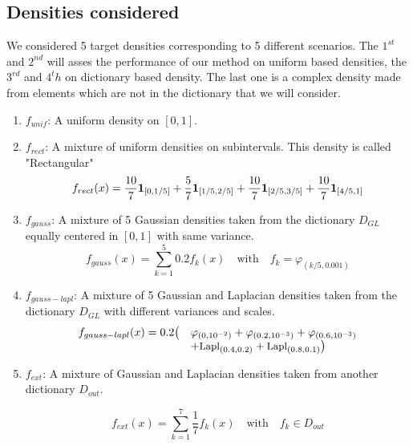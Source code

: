 \subsection{Densities considered}
We considered 5 target densities corresponding to 5 different scenarios. The $1^{st}$ and $2^{nd}$ will asses the performance of our method on uniform based densities, the $3^{rd}$ and $4^th$ on dictionary based density. The last one is a complex density made from elements which are not in the dictionary that we will consider.
\begin{enumerate}
\item{$f_{unif}$:} A uniform density on $[0,1]$.
\item{$f_{rect}$:} A mixture of uniform densities on subintervals. This density is called "Rectangular"
\begin{equation}
    f_{rect}(x)=\frac{10}{7}\b1_{[0,1/5]}+\frac{5}{7}\b1_{[1/5,2/5]}+
    \frac{10}{7}\b1_{[2/5,3/5]}+\frac{10}{7}\b1_{[4/5,1]}
\end{equation}
\item{$f_{gauss}$:} A mixture of 5 Gaussian densities taken from the dictionary $D_{GL}$ equally centered in $[0,1]$ with same variance.
\begin{equation}
    f_{gauss}(x)=\sum_{k=1}^5 0.2f_{k}(x) \quad \text{with}\quad f_k=\varphi_{(k/5,0.001)}
\end{equation}

\item{$f_{gauss-lapl}$:} A mixture of 5 Gaussian and Laplacian densities taken from the dictionary $D_{GL}$ with different variances and scales.
\begin{equation}
\begin{array}{ll}
f_{gauss-lapl}(x)=0.2\big(&\varphi_{(0 ,10^{-2})} + \varphi_{(0.2,10^{-3})}+\varphi_{(0.6,10^{-3})}\\
    &+\text{\small Lapl}_{(0.4,0.2)}+\text{\small Lapl}_{(0.8,0.1)} \big)
\end{array}
\end{equation}


\item{$f_{ext}$:} A mixture of Gaussian and Laplacian densities taken from another dictionary $D_{out}$.

\begin{equation}
    f_{ext}(x)=\sum_{k=1}^7 \frac{1}{7}f_{k}(x) \quad \text{with}\quad f_k\in D_{out}
\end{equation}
\end{enumerate}

